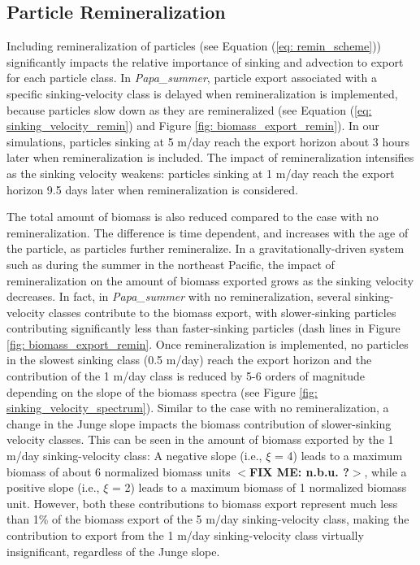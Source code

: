 \documentclass[draft,linenumbers]{agujournal2018}
\newcommand{\fixme}[1]{\color{red}$<$\textbf{FIX ME: #1}$>$\color{black}}
\begin{document}
 \subsection{Particle Remineralization}
 \label{sec: results_remin}
 
 Including remineralization of particles (see Equation (\ref{eq: remin_scheme})) significantly impacts the relative importance of sinking and advection to export for each particle class. In \textit{Papa\_summer}, particle export associated with a specific sinking-velocity class is delayed when remineralization is implemented, because particles slow down as they are remineralized (see Equation (\ref{eq: sinking_velocity_remin}) and Figure \ref{fig: biomass_export_remin}). In our simulations, particles sinking at 5 m/day reach the export horizon about 3 hours later when remineralization is included. The impact of remineralization intensifies as the sinking velocity weakens: particles sinking at 1 m/day reach the export horizon 9.5 days later when remineralization is considered.
 
 The total amount of biomass is also reduced compared to the case with no remineralization. The difference is time dependent, and increases with the age of the particle, as particles further remineralize. In a gravitationally-driven system such as during the summer in the northeast Pacific, the impact of remineralization on the amount of biomass exported grows as the sinking velocity decreases. In fact, in \textit{Papa\_summer} with no remineralization, several sinking-velocity classes contribute to the biomass export, with slower-sinking particles contributing significantly less than faster-sinking particles (dash lines in Figure \ref{fig: biomass_export_remin}. Once remineralization is implemented, no particles in the slowest sinking class (0.5 m/day) reach the export horizon and the contribution of the 1 m/day class is reduced by 5-6 orders of magnitude depending on the slope of the biomass spectra (see Figure \ref{fig: sinking_velocity_spectrum}). Similar to the case with no remineralization, a change in the Junge slope impacts the biomass contribution of slower-sinking velocity classes. This can be seen in the amount of biomass exported by the 1 m/day sinking-velocity class: A negative slope (i.e., $\xi$ = 4) leads to a maximum biomass of about 6 normalized biomass units \fixme{n.b.u. ?}, while a positive slope (i.e., $\xi$ = 2) leads to a maximum biomass of 1 normalized biomass unit. However, both these contributions to biomass export represent much less than 1\% of the biomass export of the 5 m/day sinking-velocity class, making the contribution to export from the 1 m/day sinking-velocity class virtually insignificant, regardless of the Junge slope.
 
\end{document}

